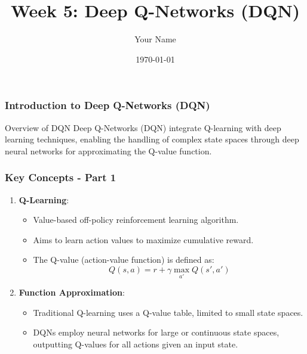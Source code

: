 \documentclass{beamer}
\title{Week 5: Deep Q-Networks (DQN)}
\author{Your Name}
\institute{Your Institution}
\date{\today}
\begin{document}
\frame{\titlepage}

\begin{frame}[fragile]
    \frametitle{Introduction to Deep Q-Networks (DQN)}
    \begin{block}{Overview of DQN}
        Deep Q-Networks (DQN) integrate Q-learning with deep learning techniques, enabling the handling of complex state spaces through deep neural networks for approximating the Q-value function.
    \end{block}
\end{frame}

\begin{frame}[fragile]
    \frametitle{Key Concepts - Part 1}
    \begin{enumerate}
        \item \textbf{Q-Learning}:
        \begin{itemize}
            \item Value-based off-policy reinforcement learning algorithm.
            \item Aims to learn action values to maximize cumulative reward.
            \item The Q-value (action-value function) is defined as:
            \begin{equation}
                Q(s, a) = r + \gamma \max_{a'} Q(s', a')
            \end{equation}
        \end{itemize}

        \item \textbf{Function Approximation}:
        \begin{itemize}
            \item Traditional Q-learning uses a Q-value table, limited to small state spaces.
            \item DQNs employ neural networks for large or continuous state spaces, outputting Q-values for all actions given an input state.
        \end{itemize}
    \end{enumerate}
\end{frame}
\end{document}

